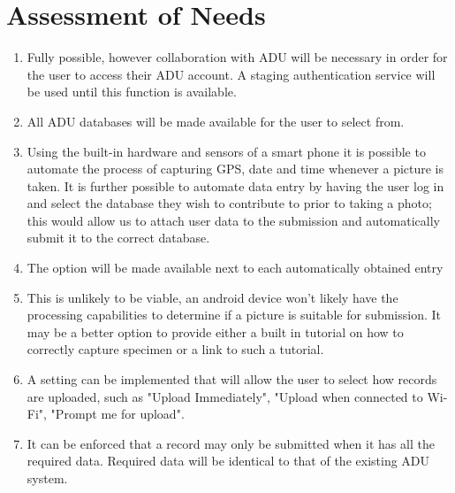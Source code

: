 \documentclass[
10pt, %
a4paper, %
oneside, %
headinclude,footinclude, %
BCOR5mm, %
]{scrartcl}
\begin{document}
\section{Assessment of Needs} %
\label{sec:assessment_of_needs}
\begin{enumerate}
\item Fully possible, however collaboration with ADU will be necessary in order for the user to access their ADU account. A staging authentication service will be used until this function is available.
\item All ADU databases will be made available for the user to select from.
\item Using the built-in hardware and sensors of a smart phone it is possible to automate the process of capturing GPS, date and time whenever a picture is taken. It is further possible to automate data entry by having the user log in and select the database they wish to contribute to prior to taking a photo; this would allow us to attach user data to the submission and automatically submit it to the correct database.
\item The option will be made available next to each automatically obtained entry
\item This is unlikely to be viable, an android device won't likely have the processing capabilities to determine if a picture is suitable for submission. It may be a better option to provide either a built in tutorial on how to correctly capture specimen or a link to such a tutorial.
\item A setting can be implemented that will allow the user to select how records are uploaded, such as "Upload Immediately", "Upload when connected to Wi-Fi", "Prompt me for upload".
\item It can be enforced that a record may only be submitted when it has all the required data. Required data will be identical to that of the existing ADU system.
\end{enumerate}

\noindent
 \\




% 


\end{document}
